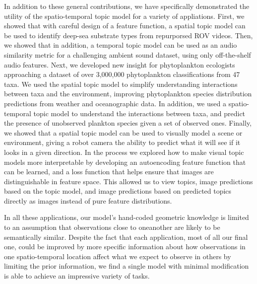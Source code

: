 In addition to these general contributions, we have specifically demonstrated the utility of the spatio-temporal topic model for a variety of appliations. First, we showed that with careful design of a feature function, a spatial topic model can be used to identify deep-sea substrate types from repurporsed ROV videos. Then, we showed that in addition, a temporal topic model can be used as an audio similarity metric for a challenging ambient sound dataset, using only off-the-shelf audio features. Next, we developed new insight for phytoplankton ecologists approaching a dataset of over 3,000,000 phytoplankton classifications from 47 taxa. We used the spatial topic model to simplify understanding interactions between taxa and the environment, improving phytoplankton species distribution predictions from weather and oceanographic data. In addition, we used a spatio-temporal topic model to understand the interactions between taxa, and predict the presence of unobserved plankton species given a set of observed ones. Finally, we showed that a spatial topic model can be used to visually model a scene or environment, giving a robot camera the ability to predict what it will see if it looks in a given direction. In the process we explored how to make visual topic models more interpretable by developing an autoencoding feature function that can be learned, and a loss function that helps ensure that images are distinguishable in feature space. This allowed us to view topics, image predictions based on the topic model, and image predictions based on predicted topics directly as images instead of pure feature distributions.

In all these applications, our model's hand-coded geometric knowledge is limited to an assumption that observations close to oneanother are likely to be semantically similar. Despite the fact that each application, most of all our final one, could be improved by more specific information about how observations in one spatio-temporal location affect what we expect to observe in others by limiting the prior information, we find a single model with minimal modification is able to achieve an impressive variety of tasks.

